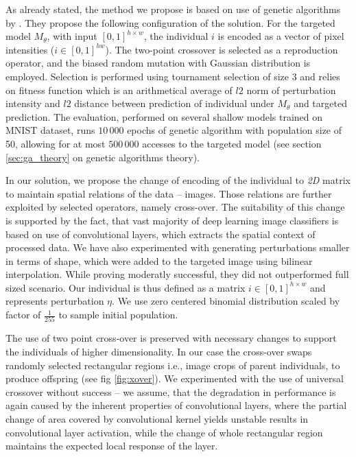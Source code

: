 As already stated, the method we propose is based on use of genetic algorithms by \cite{Vidnerova:2016:EGA:2955129.2955178}. They propose the following configuration of the solution. For the targeted model $M_\theta$, with input $[0,1]^{h \times w}$, the individual $i$ is encoded as a vector of pixel intensities ($i \in [0, 1]^{h w}$). The two-point crossover is selected as a reproduction operator, and the biased random mutation with Gaussian distribution is employed. Selection is performed using tournament selection of size 3 and relies on fitness function which is an arithmetical average of $l2$ norm of perturbation intensity and $l2$ distance between prediction of individual under $M_\theta$ and targeted prediction. The evaluation, performed on several shallow models trained on MNIST dataset, runs $10\,000$ epochs of genetic algorithm with population size of 50, allowing for at most $500\,000$ accesses to the targeted model (see section \ref{sec:ga_theory} on genetic algorithms theory).

In our solution, we propose the change of encoding of the individual to \emph{2D} matrix to maintain spatial relations of the data -- images. Those relations are further exploited by selected operators, namely cross-over. The suitability of this change is supported by the fact, that vast majority of deep learning image classifiers is based on use of convolutional layers, which extracts the spatial context of processed data. We have also experimented with generating perturbations smaller in terms of shape, which were added to the targeted image using bilinear interpolation. While proving moderatly successful, they did not outperformed full sized scenario. Our individual is thus defined as a matrix $i \in [0, 1]^{h \times w}$ and represents perturbation $\eta$. We use zero centered binomial distribution scaled by factor of $\frac{1}{255}$ to sample initial population.

The use of two point cross-over is preserved with necessary changes to support the individuals of higher dimensionality. In our case the cross-over swaps randomly selected rectangular regions i.e., image crops of parent individuals, to produce offspring (see fig \ref{fig:xover}). We experimented with the use of universal crossover without success -- we assume, that the degradation in performance is again caused by the inherent properties of convolutional layers, where the partial change of area covered by convolutional kernel yields unstable results in convolutional layer activation, while the change of whole rectangular region maintains the expected local response of the layer.

